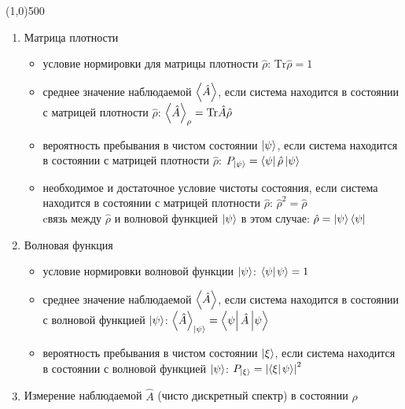 

\lfoot{\scalebox{.4}{https://github.com/xtotdam/hints-and-candies}}

\fontsize{20}{24}
\line(1,0){500}
\fontsize{12}{15}
\begin{enumerate}[label=\textbf{\underline{\arabic*.}}]
\item Матрица плотности  \begin{itemize}
            \item условие нормировки для матрицы плотности $\hat{\rho}$:
            $ \text{Tr}\hat{\rho} = 1 $
            \item среднее значение наблюдаемой $\left< \hat{A} \right>$, если система находится в состоянии с матрицей плотности $\hat{\rho}$:
            $ \left< \hat{A} \right>_\rho = \text{Tr}\hat{A}\hat{\rho} $
            \item вероятность пребывания в чистом состоянии $\left| \psi \right>$, если система находится в состоянии с матрицей плотности $\hat{\rho}$:
            $ P_{\ket{\psi}} = \matrixel{\psi}{\hat{\rho}}{\psi} $
            \item необходимое и достаточное условие чистоты состояния, если система находится в состоянии с матрицей плотности $\hat{\rho}$:
            $ \hat{\rho}^2 = \hat{\rho}$ \\
            cвязь между $\hat{\rho}$ и волновой функцией $\left| \psi \right>$ в этом случае:
            $ \hat{\rho} = \left| \psi \right>\left< \psi \right| $
        \end{itemize}
\item Волновая функция  \begin{itemize}
            \item условие нормировки волновой функции $\left| \psi \right>$:
            $ \braket{\psi}{\psi}=1 $
            \item среднее значение наблюдаемой $\left< \hat{A} \right>$, если система находится в состоянии с волновой функцией $\left| \psi \right>$:
            $ \avg{\hat{A}}_{\ket{\psi}} = \matrixel{\psi}{\hat{A}}{\psi} $
            \item вероятность пребывания в чистом состоянии $\left| \xi \right>$, если система находится в состоянии с волновой функцией $\left| \psi \right>$:
            $ P_{\ket{\xi}} = \abs{\braket{\xi}{\psi}}^2 $
        \end{itemize}
\item Измерение наблюдаемой $\hat{A}$ (чисто дискретный спектр) в состоянии $\hat{\rho}$  \begin{itemize}

\end{itemize}
\end{enumerate}
